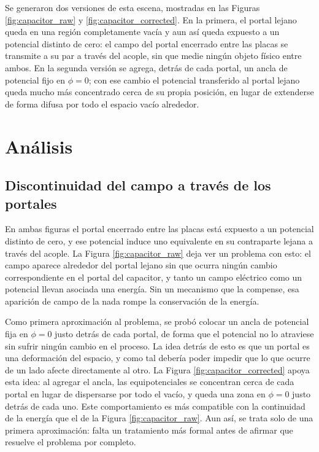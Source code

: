 \documentclass[12pt, twocolumn]{article}
\begin{document}
Se generaron dos versiones de esta escena, mostradas en las Figuras \ref{fig:capacitor_raw} y \ref{fig:capacitor_corrected}. En la primera, el portal lejano queda en una región completamente vacía y aun así queda expuesto a un potencial distinto de cero: el campo del portal encerrado entre las placas se transmite a su par a través del acople, sin que medie ningún objeto físico entre ambos. En la segunda versión se agrega, detrás de cada portal, un ancla de potencial fijo en $\phi=0$; con ese cambio el potencial transferido al portal lejano queda mucho más concentrado cerca de su propia posición, en lugar de extenderse de forma difusa por todo el espacio vacío alrededor.

\section{Análisis}

\subsection{Discontinuidad del campo a través de los portales}

En ambas figuras el portal encerrado entre las placas está expuesto a un potencial distinto de cero, y ese potencial induce uno equivalente en su contraparte lejana a través del acople. La Figura \ref{fig:capacitor_raw} deja ver un problema con esto: el campo aparece alrededor del portal lejano sin que ocurra ningún cambio correspondiente en el portal del capacitor, y tanto un campo eléctrico como un potencial llevan asociada una energía. Sin un mecanismo que la compense, esa aparición de campo de la nada rompe la conservación de la energía.

Como primera aproximación al problema, se probó colocar un ancla de potencial fija en $\phi=0$ justo detrás de cada portal, de forma que el potencial no lo atraviese sin sufrir ningún cambio en el proceso. La idea detrás de esto es que un portal es una deformación del espacio, y como tal debería poder impedir que lo que ocurre de un lado afecte directamente al otro. La Figura \ref{fig:capacitor_corrected} apoya esta idea: al agregar el ancla, las equipotenciales se concentran cerca de cada portal en lugar de dispersarse por todo el vacío, y queda una zona en $\phi=0$ justo detrás de cada uno. Este comportamiento es más compatible con la continuidad de la energía que el de la Figura \ref{fig:capacitor_raw}. Aun así, se trata solo de una primera aproximación: falta un tratamiento más formal antes de afirmar que resuelve el problema por completo.
\end{document}
